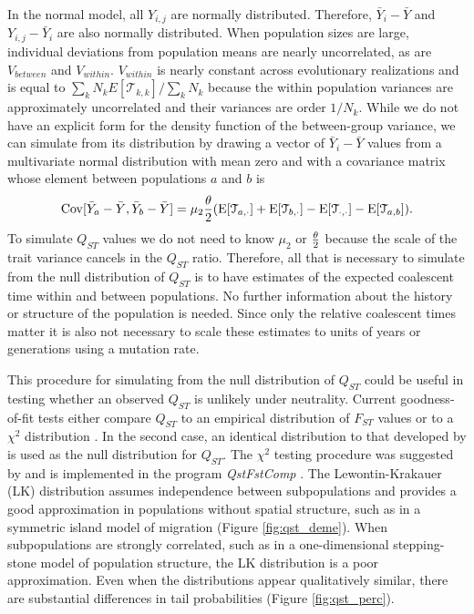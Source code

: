 In the normal model, all $Y_{i,j}$ are normally distributed. Therefore,
$\bar{Y}_{i} - \bar{Y}$ and $Y_{i,j} - \bar{Y}_i$ are also normally distributed.
When population sizes are large, individual deviations from population means are
nearly uncorrelated, as are $V_{between}$ and $V_{within}$. $V_{within}$ is
nearly constant across evolutionary realizations and is equal to $\sum_k N_k
E[\mathcal{T}_{k,k}] / \sum_k N_k$ because the within population variances are
approximately uncorrelated and their variances are order $1/N_k$. While we do
not have an explicit form for the density function of the between-group
variance, we can simulate from its distribution by drawing a vector of
$\bar{Y}_{i} - \bar{Y}$ values from a multivariate normal distribution with mean
zero and with a covariance matrix whose element between populations $a$ and $b$
is
\begin{equation}
  \mathrm{Cov}[\bar{Y}_{a} - \bar{Y}, \bar{Y}_{b} - \bar{Y}] =
  \mu_2 \frac{\theta}{2} (\mathrm{E}[\mathcal{T}_{a,\cdot}] + \mathrm{E}[\mathcal{T}_{b,\cdot}] -
  \mathrm{E}[\mathcal{T}_{\cdot,\cdot}] - \mathrm{E}[\mathcal{T}_{a,b}]).
\end{equation}
To simulate $Q_{ST}$ values we do not need to know $\mu_2$ or $\frac{\theta}{2}$ because the
scale of the trait variance cancels in the $Q_{ST}$ ratio. Therefore, all that
is necessary to simulate from the null distribution of $Q_{ST}$ is to have
estimates of the expected coalescent time within and between populations. No
further information about the history or structure of the population is needed.
Since only the relative coalescent times matter it is also not necessary to
scale these estimates to units of years or generations using a mutation rate.

This procedure for simulating from the null distribution of $Q_{ST}$ could be
useful in testing whether an observed $Q_{ST}$ is unlikely under neutrality.
Current goodness-of-fit tests either compare $Q_{ST}$ to an empirical
distribution of $F_{ST}$ values or to a $\chi^2$ distribution
\citep{Leinonen2013}. In the second case, an identical distribution to that
developed by \citet{Lewontin1973} is used as the null distribution for $Q_{ST}$.
The $\chi^2$ testing procedure was suggested by \citet{Whitlock2009} and is
implemented in the program \textit{QstFstComp} \citep{Gilbert2015}. The
Lewontin-Krakauer (LK) distribution assumes independence between subpopulations
and provides a good approximation in populations without spatial structure, such
as in a symmetric island model of migration (Figure \ref{fig:qst_deme}). When
subpopulations are strongly correlated, such as in a one-dimensional
stepping-stone model of population structure, the LK distribution is a poor
approximation. Even when the distributions appear qualitatively similar, there
are substantial differences in tail probabilities (Figure \ref{fig:qst_perc}).

